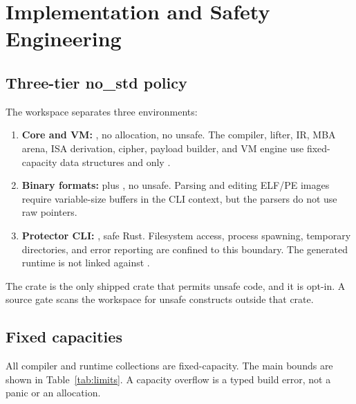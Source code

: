 \section{Implementation and Safety Engineering}
\label{sec:implementation}

\subsection{Three-tier no\_std policy}

The workspace separates three environments:

\begin{enumerate}
  \item \textbf{Core and VM:} , no allocation, no unsafe. The
        compiler, lifter, IR, MBA arena, ISA derivation, cipher, payload
        builder, and VM engine use fixed-capacity data structures and only
        .
  \item \textbf{Binary formats:}  plus , no unsafe.
        Parsing and editing ELF/PE images require variable-size buffers in the
        CLI context, but the parsers do not use raw pointers.
  \item \textbf{Protector CLI:} , safe Rust. Filesystem access,
        process spawning, temporary directories, and error reporting are
        confined to this boundary. The generated runtime is not linked against
        .
\end{enumerate}

The  crate is the only shipped crate that permits unsafe
code, and it is opt-in. A source gate scans the workspace for unsafe constructs
outside that crate.

\subsection{Fixed capacities}

All compiler and runtime collections are fixed-capacity. The main bounds are
shown in Table~\ref{tab:limits}. A capacity overflow is a typed build error, not
a panic or an allocation.

